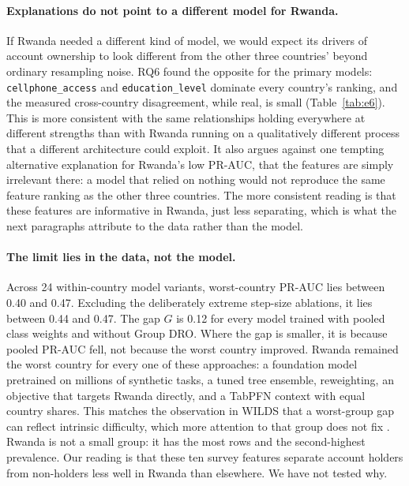 \documentclass[11pt]{article}
\begin{document}
\paragraph{Explanations do not point to a different model for Rwanda.} If Rwanda needed a different kind of model, we would expect its drivers of account ownership to look different from the other three countries' beyond ordinary resampling noise. RQ6 found the opposite for the primary models: \texttt{cellphone\_access} and \texttt{education\_level} dominate every country's ranking, and the measured cross-country disagreement, while real, is small (Table~\ref{tab:e6}). This is more consistent with the same relationships holding everywhere at different strengths than with Rwanda running on a qualitatively different process that a different architecture could exploit. It also argues against one tempting alternative explanation for Rwanda's low PR-AUC, that the features are simply irrelevant there: a model that relied on nothing would not reproduce the same feature ranking as the other three countries. The more consistent reading is that these features are informative in Rwanda, just less separating, which is what the next paragraphs attribute to the data rather than the model.

\paragraph{The limit lies in the data, not the model.} Across 24 within-country model variants, worst-country PR-AUC lies between 0.40 and 0.47. Excluding the deliberately extreme step-size ablations, it lies between 0.44 and 0.47. The gap $G$ is 0.12 for every model trained with pooled class weights and without Group DRO. Where the gap is smaller, it is because pooled PR-AUC fell, not because the worst country improved. Rwanda remained the worst country for every one of these approaches: a foundation model pretrained on millions of synthetic tasks, a tuned tree ensemble, reweighting, an objective that targets Rwanda directly, and a TabPFN context with equal country shares. This matches the observation in WILDS that a worst-group gap can reflect intrinsic difficulty, which more attention to that group does not fix \citep[pp.~113--115]{koh2021wilds}. Rwanda is not a small group: it has the most rows and the second-highest prevalence. Our reading is that these ten survey features separate account holders from non-holders less well in Rwanda than elsewhere. We have not tested why.
\end{document}
